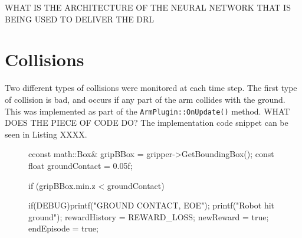\documentclass[a4paper]{article}
\begin{document}
\begin{figure}[h]\scriptsize
{}
\end{figure}

WHAT IS THE ARCHITECTURE OF THE NEURAL NETWORK THAT IS BEING USED TO DELIVER THE DRL\\


\section{Collisions}
Two different types of collisions were monitored at each time step. The first type of collision is bad, and occurs if any part of the arm collides with the ground. This was implemented as part of the \texttt{ArmPlugin::OnUpdate()} method. WHAT DOES THE PIECE OF CODE DO? The implementation code snippet can be seen in Listing XXXX.
\begin{figure}[h]\scriptsize
\begin{sexylisting}
cconst math::Box& gripBBox = gripper->GetBoundingBox();
const float groundContact = 0.05f;

if (gripBBox.min.z < groundContact){
						
    if(DEBUG){printf("GROUND CONTACT, EOE\n");}
    printf("Robot hit ground");
    rewardHistory = REWARD_LOSS;
    newReward     = true;
    endEpisode    = true;
}
\end{sexylisting}
\end{figure}
\end{document}
